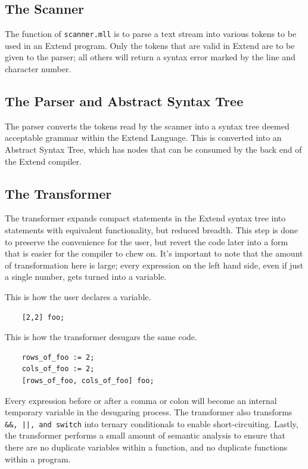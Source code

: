   \subsection{The Scanner}
  The function of \texttt{scanner.mll} is to parse a text stream into various tokens to be used in an Extend program.
  Only the tokens that are valid in Extend are to be given to the parser; all others will return a syntax error marked by the line and character number.

  \subsection{The Parser and Abstract Syntax Tree}
  The parser converts the tokens read by the scanner into a syntax tree deemed acceptable grammar within the Extend Language. This is converted into an Abstract Syntax Tree, which has nodes that can be consumed by the back end of the Extend compiler.

  \subsection{The Transformer}
  The transformer expands compact statements in the Extend syntax tree into statements with equivalent functionality, but reduced breadth. This step is done to preserve the convenience for the user, but revert the code later into a form that is easier for the compiler to chew on. It's important to note that the amount of transformation here is large; every expression on the left hand side, even if just a single number, gets turned into a variable.

  \medskip \noindent This is how the user declares a variable.
  \begin{lstlisting}
    [2,2] foo;
  \end{lstlisting}

  \medskip \noindent This is how the transformer desugars the same code.
  \begin{lstlisting}
    rows_of_foo := 2;
    cols_of_foo := 2;
    [rows_of_foo, cols_of_foo] foo;
  \end{lstlisting}

  \medskip \noindent
  Every expression before or after a comma or colon will become an internal temporary variable in the desugaring process. The transformer also transforms \texttt{\&\&, ||, and switch} into ternary conditionals to enable short-circuiting. Lastly, the transformer performs a small amount of semantic analysis to ensure that there are no duplicate variables within a function, and no duplicate functions within a program.

